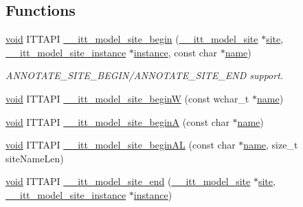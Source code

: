 \subsection*{Functions}
\begin{DoxyCompactItemize}
\item 
\hyperlink{ittnotify__static_8h_af941d56e55e3c5465135b60c4d6343ed}{void} I\-T\-T\-A\-P\-I \hyperlink{group__model_gaa3168df03ab6c8a28c0534fb26dc48c5}{\-\_\-\-\_\-itt\-\_\-model\-\_\-site\-\_\-begin} (\hyperlink{group__model_ga920087b18ed59a70239461b5295cc26e}{\-\_\-\-\_\-itt\-\_\-model\-\_\-site} $\ast$\hyperlink{ittnotify__static_8h_a6451a8ea1fbd86415de4e32f112e7b34}{site}, \hyperlink{group__model_gaa037f000a165fb7fc2c73b97b31491f1}{\-\_\-\-\_\-itt\-\_\-model\-\_\-site\-\_\-instance} $\ast$\hyperlink{ittnotify__static_8h_ab279bddbbeb45ffb20ea9886348683b1}{instance}, const char $\ast$\hyperlink{ittnotify__static_8h_a1c34b35a4952969fef60192313bba34a}{name})
\begin{DoxyCompactList}\small\item\em A\-N\-N\-O\-T\-A\-T\-E\-\_\-\-S\-I\-T\-E\-\_\-\-B\-E\-G\-I\-N/\-A\-N\-N\-O\-T\-A\-T\-E\-\_\-\-S\-I\-T\-E\-\_\-\-E\-N\-D support. \end{DoxyCompactList}\item 
\hyperlink{ittnotify__static_8h_af941d56e55e3c5465135b60c4d6343ed}{void} I\-T\-T\-A\-P\-I \hyperlink{group__model_ga1a2a8393f594d8998c2d5022154ae605}{\-\_\-\-\_\-itt\-\_\-model\-\_\-site\-\_\-begin\-W} (const wchar\-\_\-t $\ast$\hyperlink{ittnotify__static_8h_a1c34b35a4952969fef60192313bba34a}{name})
\item 
\hyperlink{ittnotify__static_8h_af941d56e55e3c5465135b60c4d6343ed}{void} I\-T\-T\-A\-P\-I \hyperlink{group__model_ga5a0b72caf3a67067e456675d357104f4}{\-\_\-\-\_\-itt\-\_\-model\-\_\-site\-\_\-begin\-A} (const char $\ast$\hyperlink{ittnotify__static_8h_a1c34b35a4952969fef60192313bba34a}{name})
\item 
\hyperlink{ittnotify__static_8h_af941d56e55e3c5465135b60c4d6343ed}{void} I\-T\-T\-A\-P\-I \hyperlink{group__model_ga4a35497abdc2fbfeb77bb375f7a6d8dc}{\-\_\-\-\_\-itt\-\_\-model\-\_\-site\-\_\-begin\-A\-L} (const char $\ast$\hyperlink{ittnotify__static_8h_a1c34b35a4952969fef60192313bba34a}{name}, size\-\_\-t site\-Name\-Len)
\item 
\hyperlink{ittnotify__static_8h_af941d56e55e3c5465135b60c4d6343ed}{void} I\-T\-T\-A\-P\-I \hyperlink{group__model_ga979718d663efa6f9250fdb892a7e8e08}{\-\_\-\-\_\-itt\-\_\-model\-\_\-site\-\_\-end} (\hyperlink{group__model_ga920087b18ed59a70239461b5295cc26e}{\-\_\-\-\_\-itt\-\_\-model\-\_\-site} $\ast$\hyperlink{ittnotify__static_8h_a6451a8ea1fbd86415de4e32f112e7b34}{site}, \hyperlink{group__model_gaa037f000a165fb7fc2c73b97b31491f1}{\-\_\-\-\_\-itt\-\_\-model\-\_\-site\-\_\-instance} $\ast$\hyperlink{ittnotify__static_8h_ab279bddbbeb45ffb20ea9886348683b1}{instance})

\end{DoxyCompactItemize}
